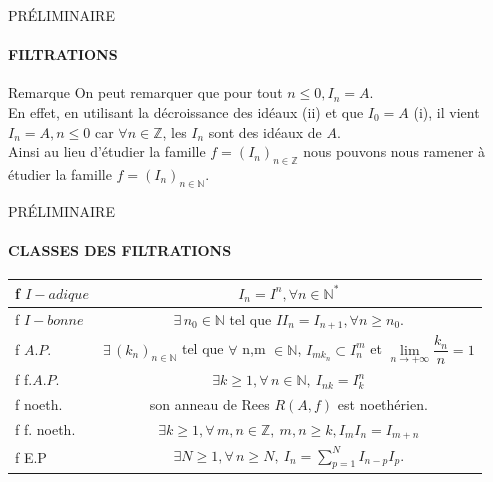 \documentclass[11pt,a4paper]{beamer}
\begin{document}
		\begin{frame}{PRÉLIMINAIRE}
		\framesubtitle{FILTRATIONS}
		\begin{alertblock}{Remarque}
		On peut remarquer que pour tout $n\leq 0, I_n = A$.\\ En effet, en utilisant la décroissance des idéaux (ii) et que $I_0 = A$ (i), il vient $I_n = A, n \leq 0$ car $\forall n \in \mathbb{Z}$, les $I_n$ sont des idéaux de $A$.\\
		Ainsi au lieu d'étudier la famille $f = (I_n)_{n \in \mathbb{Z}}$ nous pouvons nous ramener à étudier la famille $f = (I_n)_{n \in \mathbb{N}}$.
		\end{alertblock}
	\end{frame}
		\begin{frame}{PRÉLIMINAIRE}
		\framesubtitle{CLASSES DES FILTRATIONS}
		\begin{block}{}
		\begin{center}
			\begin{tabular}{|l|c|}
				\hline
				f $I-adique$ &$I_n=I^n,\forall n \in \mathbb{N}^*$\\
				\hline
				f $I-bonne$ &$\exists \, n_0 \in \mathbb{N}$ tel que $II_n = I_{n+1}, \forall n \geqslant n_0.$\\
				\hline
				f $A.P.$ &$\exists \, (k_n)_{n\in \mathbb{N}} $ tel que $\forall$ n,m $\in \mathbb{N}$, $I_{mk_n} \subset I_n^{m}$ et $\underset{n\longrightarrow +\infty }{\lim }\dfrac{k_{n}}{n}=1$\\
				\hline
				f f.$A.P.$ &$\exists k\geqslant 1, \forall \, n \in \mathbb{N}, \ I_{nk} = I_k^n$\\
				\hline
				f noeth. & son anneau de Rees ${R}(A,f)$ est noethérien.\\
				\hline
				f f. noeth. & $\exists k\geqslant 1, \forall \, m, n \in \mathbb{Z}, \ m, n \geqslant k, I_m I_n = I_{m+n}$\\
				\hline
				f E.P & $\exists N\geqslant 1, \forall \, n \geqslant N, \ I_n =\sum\limits_{p=1}^{N} I_{n-p}I_p. $\\
				\hline
			\end{tabular}
		\end{center}
		\end{block}
	\end{frame}
	
	
	
\end{document}
